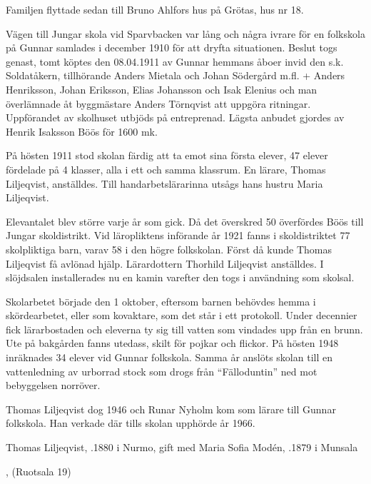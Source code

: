 Familjen flyttade sedan till Bruno Ahlfors hus på Grötas, hus nr 18.


%
Vägen till Jungar skola vid Sparvbacken var lång och några ivrare för en folkskola på Gunnar samlades i december 1910 för att dryfta situationen. Beslut togs genast, tomt köptes den 08.04.1911 av Gunnar hemmans åboer invid den s.k. Soldatåkern, tillhörande Anders Mietala och Johan Södergård m.fl. + Anders Henriksson, Johan Eriksson, Elias Johansson och Isak Elenius och man överlämnade åt byggmästare Anders Törnqvist att uppgöra ritningar. Uppförandet av skolhuset utbjöds på entreprenad. Lägsta anbudet gjordes av Henrik Isaksson Böös för 1600 mk.

På hösten 1911 stod skolan färdig att ta emot sina första elever, 47 elever fördelade på 4 klasser, alla i ett och samma klassrum. En lärare, Thomas Liljeqvist, anställdes. Till handarbetslärarinna utsågs hans hustru Maria Liljeqvist.

Elevantalet blev större varje år som gick. Då det överskred 50 överfördes Böös till Jungar skoldistrikt. Vid läropliktens införande år 1921 fanns i skoldistriktet 77 skolpliktiga barn, varav 58 i den högre folkskolan. Först då kunde Thomas Liljeqvist få avlönad hjälp. Lärardottern Thorhild Liljeqvist anställdes. I slöjdsalen installerades nu en kamin varefter den togs i användning som skolsal.

Skolarbetet började den 1 oktober, eftersom barnen behövdes hemma i skördearbetet, eller som kovaktare, som det står i ett protokoll. Under decennier fick lärarbostaden och eleverna ty sig till vatten som vindades upp från en brunn. Ute på bakgården fanns utedass, skilt för pojkar och flickor. På hösten 1948 inräknades 34 elever vid Gunnar folkskola. Samma år anslöts skolan till en vattenledning av urborrad stock som drogs från ``Fälloduntin'' ned mot bebyggelsen norröver.

Thomas Liljeqvist dog 1946 och Runar Nyholm kom som lärare till Gunnar folkskola. Han verkade där tills skolan upphörde år 1966.



Thomas Liljeqvist, .1880 i Nurmo, gift med Maria Sofia Modén,  .1879 i Munsala

\begin{jhchildren}
  \item {}
  \item {}
  \item {}
  \item {}
  \item {}, (Ruotsala 19)
\end{jhchildren}

